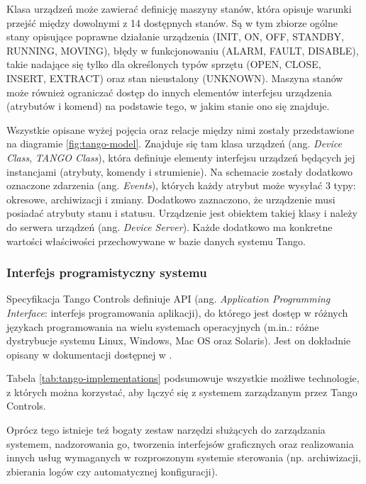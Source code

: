 Klasa urządzeń może zawierać definicję maszyny stanów, która opisuje warunki przejść między dowolnymi z 14 dostępnych stanów. Są w tym zbiorze ogólne stany opisujące poprawne działanie urządzenia (INIT, ON, OFF, STANDBY, RUNNING, MOVING), błędy w funkcjonowaniu (ALARM, FAULT, DISABLE), takie nadające się tylko dla określonych typów sprzętu (OPEN, CLOSE, INSERT, EXTRACT) oraz stan nieustalony (UNKNOWN). Maszyna stanów może również ograniczać dostęp do innych elementów interfejsu urządzenia (atrybutów i komend) na podstawie tego, w jakim stanie ono się znajduje.

Wszystkie opisane wyżej pojęcia oraz relacje między nimi zostały przedstawione na diagramie \ref{fig:tango-model}. Znajduje się tam klasa urządzeń (ang. \emph{Device Class}, \emph{TANGO Class}), która definiuje elementy interfejsu urządzeń będących jej instancjami (atrybuty, komendy i strumienie).
Na schemacie zostały dodatkowo oznaczone zdarzenia (ang. \emph{Events}), których każdy atrybut może wysyłać 3 typy: okresowe, archiwizacji i zmiany. Dodatkowo zaznaczono, że urządzenie musi posiadać atrybuty stanu i statusu.
Urządzenie jest obiektem takiej klasy i należy do serwera urządzeń (ang. \emph{Device Server}). Każde dodatkowo ma konkretne wartości właściwości przechowywane w bazie danych systemu Tango.

\subsubsection{Interfejs programistyczny systemu}
Specyfikacja Tango Controls definiuje API (ang. \emph{Application Programming Interface}: interfejs programowania aplikacji), do którego jest dostęp w różnych językach programowania na wielu systemach operacyjnych (m.in.: różne dystrybucje systemu Linux, Windows, Mac OS oraz Solaris). Jest on dokładnie opisany w dokumentacji dostępnej w \cite{TangoDocs}.

Tabela \ref{tab:tango-implementations} podsumowuje wszystkie możliwe technologie, z których można korzystać, aby łączyć się z systemem zarządzanym przez Tango Controls.

Oprócz tego istnieje też bogaty zestaw narzędzi służących do zarządzania systemem, nadzorowania go, tworzenia interfejsów graficznych oraz realizowania innych usług wymaganych w rozproszonym systemie sterowania (np. archiwizacji, zbierania logów czy automatycznej konfiguracji).

